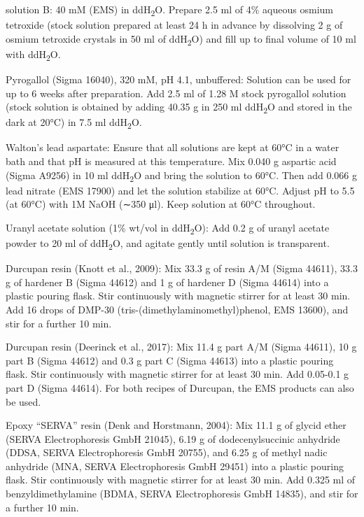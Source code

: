\documentclass{article}
\begin{document}
\noindent {} solution B: 40 mM  (EMS) in ddH\textsubscript{2}O. Prepare 2.5 ml of 4\% aqueous osmium tetroxide (stock solution prepared at least 24 h in advance by dissolving 2 g of osmium tetroxide crystals in 50 ml of ddH\textsubscript{2}O) and fill up to final volume of 10 ml with ddH\textsubscript{2}O.

Pyrogallol (Sigma 16040), 320 mM, pH 4.1, unbuffered: Solution can be used for up to 6 weeks after preparation. Add 2.5 ml of 1.28 M stock pyrogallol solution (stock solution is obtained by adding 40.35 g in 250 ml ddH\textsubscript{2}O and stored in the dark at 20°C) in 7.5 ml ddH\textsubscript{2}O.

Walton’s lead aspartate: Ensure that all solutions are kept at 60°C in a water bath and that pH is measured at this temperature. Mix 0.040 g aspartic acid (Sigma A9256) in 10 ml ddH\textsubscript{2}O and bring the solution to 60°C. Then add 0.066 g lead nitrate (EMS 17900) and let the solution stabilize at 60°C. Adjust pH to 5.5 (at 60°C) with 1M NaOH (∼350 μl). Keep solution at 60°C throughout.

Uranyl acetate solution (1\% wt/vol in ddH\textsubscript{2}O): Add 0.2 g of uranyl acetate powder to 20 ml of ddH\textsubscript{2}O, and agitate gently until solution is transparent.

Durcupan resin (Knott et al., 2009): Mix 33.3 g of resin A/M (Sigma 44611), 33.3 g of hardener B (Sigma 44612) and 1 g of hardener D (Sigma 44614) into a plastic pouring flask. Stir continuously with magnetic stirrer for at least 30 min. Add 16 drops of DMP-30 (tris-(dimethylaminomethyl)phenol, EMS 13600), and stir for a further 10 min.

Durcupan resin (Deerinck et al., 2017): Mix 11.4 g part A/M (Sigma 44611), 10 g part B (Sigma 44612) and 0.3 g part C (Sigma 44613) into a plastic pouring flask. Stir continuously with magnetic stirrer for at least 30 min. Add 0.05-0.1 g part D (Sigma 44614). For both recipes of Durcupan, the EMS products can also be used.

Epoxy “SERVA” resin (Denk and Horstmann, 2004): Mix 11.1 g of glycid ether (SERVA Electrophoresis GmbH 21045), 6.19 g of dodecenylsuccinic anhydride (DDSA, SERVA Electrophoresis GmbH 20755), and 6.25 g of methyl nadic anhydride (MNA, SERVA Electrophoresis GmbH 29451) into a plastic pouring flask. Stir continuously with magnetic stirrer for at least 30 min. Add 0.325 ml of benzyldimethylamine (BDMA, SERVA Electrophoresis GmbH 14835), and stir for a further 10 min.
\end{document}
